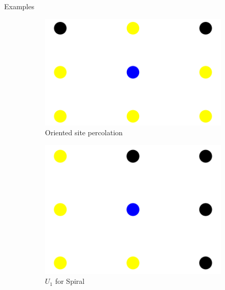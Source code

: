 \begin{frame}{Examples}
\begin{figure}
  \centering
  \begin{subfigure}{.2\linewidth}
    \centering
    \includegraphics[width = \linewidth]{rgospercrule.png}
    \caption{Oriented site percolation}
  \end{subfigure}%
  \hspace{2em}%
  \begin{subfigure}{.2\linewidth}
    \centering
    \includegraphics[width = \linewidth]{rgspiralpercrule1.png}
    \caption{$U_1$ for Spiral}
  \end{subfigure}%
  \hspace{2em}%
  \begin{subfigure}{.2\linewidth}
    \centering

\end{subfigure}
\end{figure}
\end{frame}

